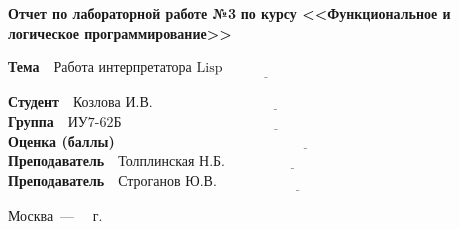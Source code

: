 \begin{titlepage}
	
	\begin{center}
		\Large\textbf{Отчет по лабораторной работе №3}
		\Large\textbf{по курсу <<Функциональное и логическое программирование>>}
	\end{center}


	\noindent\textbf{Тема} $\underline{\text{~~Работа интерпретатора Lisp~~~~~~~~~~~~~~~~~~~~~~~~~~~~~~~~~~~~~~~~~~~~~~~~~~~~~~~~~}}$\newline\newline\newline


	\noindent\textbf{Студент} $\underline{\text{~~Козлова И.В.~~~~~~~~~~~~~~~~~~~~~~~~~~~~~~~~~~~~~~~~~~~~~~~~~~~~~~~~~~~~~~~~~~~~~~~~}}$\newline\newline
	\noindent\textbf{Группа} $\underline{\text{~~ИУ7-62Б~~~~~~~~~~~~~~~~~~~~~~~~~~~~~~~~~~~~~~~~~~~~~~~~~~~~~~~~~~~~~~~~~~~~~~~~~~~~~~~~}}$\newline\newline
	\noindent\textbf{Оценка (баллы)} $\underline{\text{~~~~~~~~~~~~~~~~~~~~~~~~~~~~~~~~~~~~~~~~~~~~~~~~~~~~~~~~~~~~~~~~~~~~~~~~~~~~~~~~}}$\newline\newline
	\noindent\textbf{Преподаватель} $\underline{\text{~~Толплинская Н.Б.~~~~~~~~~~~~~~~~~~~~~~~~~~~~~~~~~~~~~~~~~~~~~~~~~~~~~~}}$\newline\newline
	\noindent\textbf{Преподаватель} $\underline{\text{~~Строганов Ю.В.~~~~~~~~~~~~~~~~~~~~~~~~~~~~~~~~~~~~~~~~~~~~~~~~~~~~~~~~~~}}$\newline
	
	\begin{center}
		\vfill
		Москва~---~\the\year
		~г.
	\end{center}
	\restoregeometry
\end{titlepage}

